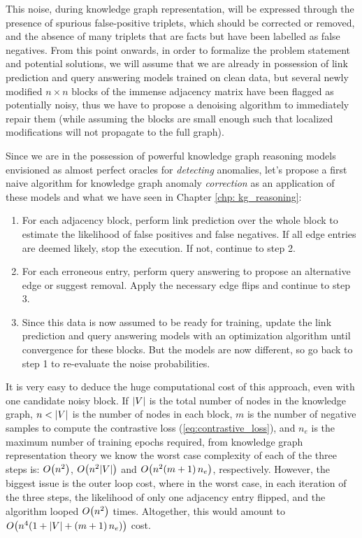 This noise, during knowledge graph representation, will be expressed through the presence of spurious false-positive triplets, which should be corrected or removed, and the absence of many triplets that are facts but have been labelled as false negatives. From this point onwards, in order to formalize the problem statement and potential solutions, we will assume that we are already in possession of link prediction and query answering models trained on clean data, but several newly modified $n \times n$ blocks of the immense adjacency matrix have been flagged as potentially noisy, thus we have to propose a denoising algorithm to immediately repair them (while assuming the blocks are small enough such that localized modifications will not propagate to the full graph).

Since we are in the possession of powerful knowledge graph reasoning models envisioned as almost perfect oracles for \emph{detecting} anomalies, let's propose a first naive algorithm for knowledge graph anomaly \emph{correction} as an application of these models and what we have seen in Chapter \ref{chp: kg_reasoning}:

\begin{enumerate}
    \item For each adjacency block, perform link prediction over the whole block to estimate the likelihood of false positives and false negatives. If all edge entries are deemed likely, stop the execution. If not, continue to step 2.
    \item For each erroneous entry, perform query answering to propose an alternative edge or suggest removal. Apply the necessary edge flips and continue to step 3.
    \item Since this data is now assumed to be ready for training, update the link prediction and query answering models with an optimization algorithm until convergence for these blocks. But the models are now different, so go back to step 1 to re-evaluate the noise probabilities.
\end{enumerate}

It is very easy to deduce the huge computational cost of this approach, even with one candidate noisy block. If $\mathopen{}\left|V\right|$ is the total number of nodes in the knowledge graph, $n < \mathopen{}\left|V\right|$ is the number of nodes in each block, $m$ is the number of negative samples to compute the contrastive loss (\ref{eq:contrastive_loss}), and $n_e$ is the maximum number of training epochs required, from knowledge graph representation theory we know the worst case complexity of each of the three steps is: $O\mathopen{}\left(n^2\right)$, $O\mathopen{}\left(n^2\mathopen{}\left|V\right|\right)$ and $O\mathopen{}\left(n^2 \mathopen{}\left(m+1\right)n_e\right)$, respectively. However, the biggest issue is the outer loop cost, where in the worst case, in each iteration of the three steps, the likelihood of only one adjacency entry flipped, and the algorithm looped $O\mathopen{}\left(n^2\right)$ times. Altogether, this would amount to $O\mathopen{}\left(n^4\mathopen{}\left(1+\mathopen{}\left|V\right|+\mathopen{}\left(m+1\right)n_e\right)\right)$ cost. 

